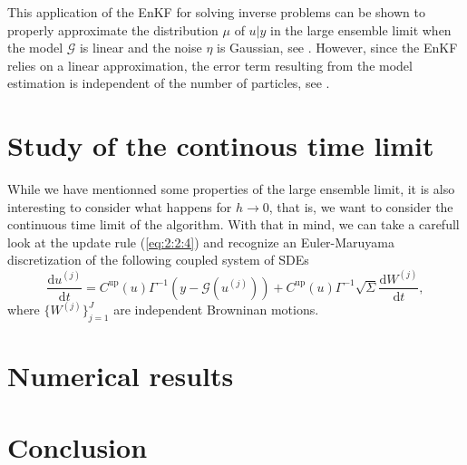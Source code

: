 \documentclass[a4paper,12pt]{elsarticle}
\begin{document}
This application of the EnKF for solving inverse problems can be shown to properly approximate the
distribution $\mu$ of $u|y$ in the large ensemble limit when the model $\mathcal{G}$ is linear and
the noise $\eta$ is Gaussian, see \cite{goldstein2007bayes, law2016deterministic}. However, since the
EnKF relies on a linear approximation, the error term resulting from the model estimation is independent
of the number of particles, see \cite{ernst2015analysis}.

\section{Study of the continous time limit} \label{sec:3}

While we have mentionned some properties of the large ensemble limit, it is also interesting to consider
what happens for $h \rightarrow 0$, that is, we want to consider the continuous time limit
of the algorithm. With that in mind, we can take a carefull look at the update rule (\ref{eq:2:2:4}) and
recognize an Euler-Maruyama discretization of the following coupled system of SDEs
\begin{equation} \label{eq:3:1}
    \frac{\text{d}u^{(j)}}{\text{d}t} = C^{\text{up}}(u)\Gamma^{-1}\left(y - \mathcal{G}(u^{(j)})\right) + C^{\text{up}}(u)\Gamma^{-1}\sqrt{\Sigma}\frac{\text{d}W^{(j)}}{\text{d}t},
\end{equation}
where $\{W^{(j)}\}_{j=1}^J$ are independent Browninan motions.
\section{Numerical results} \label{sec:4}

\section{Conclusion} \label{sec:5}



\end{document}
